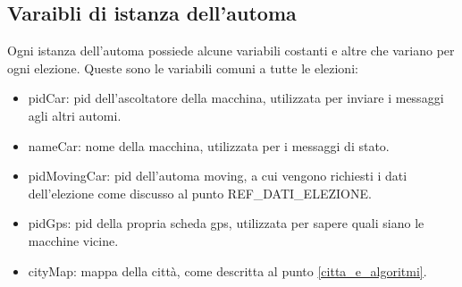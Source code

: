 \subsection{Varaibli di istanza dell'automa}\label{stato_elezione_automa}
Ogni istanza dell'automa possiede alcune variabili costanti e altre che variano per ogni elezione. Queste sono le variabili comuni a tutte le elezioni:
\begin{itemize}
	\item pidCar: pid dell'ascoltatore della macchina, utilizzata per inviare i messaggi agli altri automi.
	\item nameCar: nome della macchina, utilizzata per i messaggi di stato.
	\item pidMovingCar: pid dell'automa moving, a cui vengono richiesti i dati dell'elezione come discusso al punto REF\_DATI\_ELEZIONE.
	\item pidGps: pid della propria scheda gps, utilizzata per sapere quali siano le macchine vicine.
	\item cityMap: mappa della città, come descritta al punto \ref{citta_e_algoritmi}.
\end{itemize}

